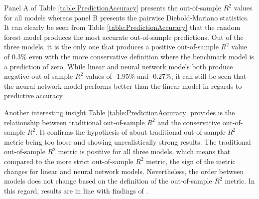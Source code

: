 \documentclass[12pt]{article}
\begin{document}
Panel A of Table \ref{table:PredictionAccuracy} presents the out-of-sample $R^2$ values for all models whereas panel B presents the pairwise Diebold-Mariano statistics. It can clearly be seen from Table \ref{table:PredictionAccuracy} that the random forest model produces the most accurate out-of-sample predictions. Out of the three models, it is the only one that produces a positive out-of-sample $R^2$ value of 0.3\% even with the more conservative definition where the benchmark model is a prediction of zero. While linear and neural network models both produce negative out-of-sample $R^2$ values of -1.95\% and -0.27\%, it can still be seen that the neural network model performs better than the linear model in regards to predictive accuracy. \par

Another interesting insight Table \ref{table:PredictionAccuracy} provides is the relationship between traditional out-of-sample $R^2$ and the conservative out-of-sample $R^2$. It confirms the hypothesis of \citet{guetal} about traditional out-of-sample $R^2$ metric being too loose and showing unrealistically strong results.\footnotemark {} The traditional out-of-sample $R^2$ metric is positive for all three models, which means that compared to the more strict out-of-sample $R^2$ metric, the sign of the metric changes for linear and neural network models. Nevertheless, the order between models does not change based on the definition of the out-of-sample $R^2$ metric. In this regard, results are in line with findings of \citet{Fieberg}.\footnotemark {} \par
\end{document}
